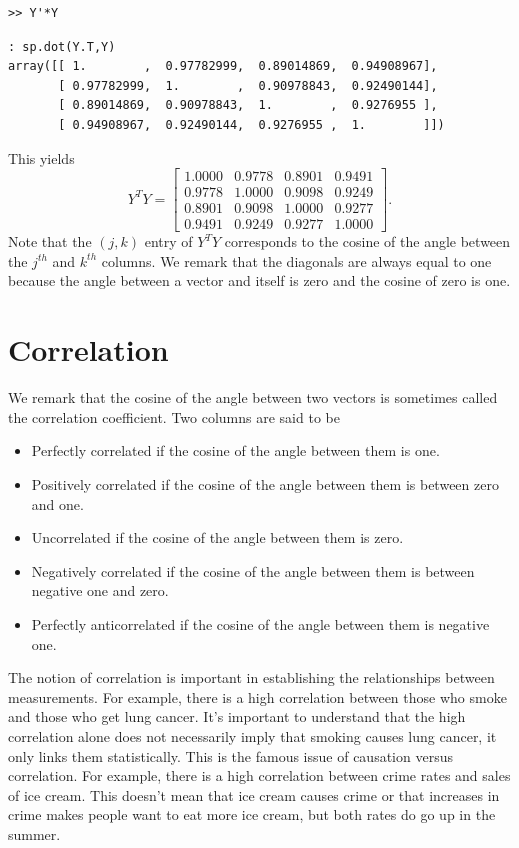 \begin{matlab}
\begin{lstlisting}[style=matlab]
>> Y'*Y
\end{lstlisting}
\end{matlab}
\begin{python}
\begin{lstlisting}[style=python]
: sp.dot(Y.T,Y)
array([[ 1.        ,  0.97782999,  0.89014869,  0.94908967],
       [ 0.97782999,  1.        ,  0.90978843,  0.92490144],
       [ 0.89014869,  0.90978843,  1.        ,  0.9276955 ],
       [ 0.94908967,  0.92490144,  0.9276955 ,  1.        ]])
\end{lstlisting}
\end{python}
This yields
\[
Y^T Y = 
\begin{bmatrix}
1.0000 & 0.9778 & 0.8901 & 0.9491\\
0.9778 & 1.0000 & 0.9098 & 0.9249\\
0.8901 & 0.9098 & 1.0000 & 0.9277\\
0.9491 & 0.9249 & 0.9277 & 1.0000
\end{bmatrix}.
\]
Note that the $(j,k)$ entry of $Y^T Y$ corresponds to the cosine of the angle between the $j^{th}$ and $k^{th}$ columns.  We remark that the diagonals are always equal to one because the angle between a vector and itself is zero and the cosine of zero is one.

\section*{Correlation}

We remark that the cosine of the angle between two vectors is sometimes called the correlation coefficient.  Two columns are said to be 
\begin{itemize}
\item Perfectly correlated if the cosine of the angle between them is one.
\item Positively correlated if the cosine of the angle between them is between zero and one.
\item Uncorrelated if the cosine of the angle between them is zero.
\item Negatively correlated if the cosine of the angle between them is between negative one and zero.
\item Perfectly anticorrelated if the cosine of the angle between them is negative one.
\end{itemize}

The notion of correlation is important in establishing the relationships between measurements.  For example, there is a high correlation between those who smoke and those who get lung cancer.  It's important to understand that the high correlation alone does not necessarily imply that smoking causes lung cancer, it only links them statistically.  This is the famous issue of causation versus correlation.  For example, there is a high correlation between crime rates and sales of ice cream.  This doesn't mean that ice cream causes crime or that increases in crime makes people want to eat more ice cream, but both rates do go up in the summer.

